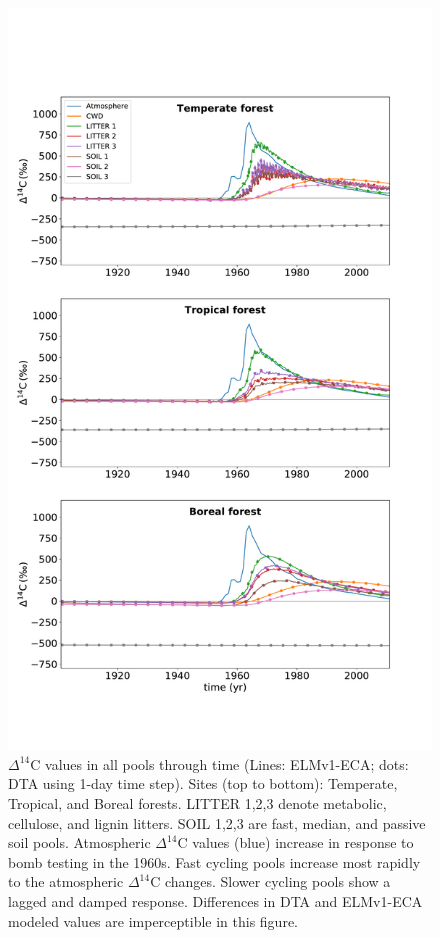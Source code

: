 \documentclass[11pt,a4paper]{article}
\begin{document}
\begin{figure}[htbp]
        \centering 
        \vspace{-8em}
        \includegraphics[width=1.0\linewidth]{figs/Delta_14C_through_time_per_pools_10.pdf}
        \vspace{-4em}
        \caption{$\Delta^{14}$C values in all pools through time (Lines: ELMv1-ECA; dots: DTA using 1-day time step). Sites (top to bottom): Temperate, Tropical, and Boreal forests. LITTER 1,2,3 denote metabolic, cellulose, and lignin litters. SOIL 1,2,3 are fast, median, and passive soil pools. Atmospheric $\Delta^{14}$C values (blue) increase in response to bomb testing in the 1960s. Fast cycling pools increase most rapidly to the atmospheric $\Delta^{14}$C changes. Slower cycling pools show a lagged and damped response. Differences in DTA and ELMv1-ECA modeled values are imperceptible in this figure.
        \label{fig:poolsOverTime}
        }
    \end{figure}    
    
\end{document}
